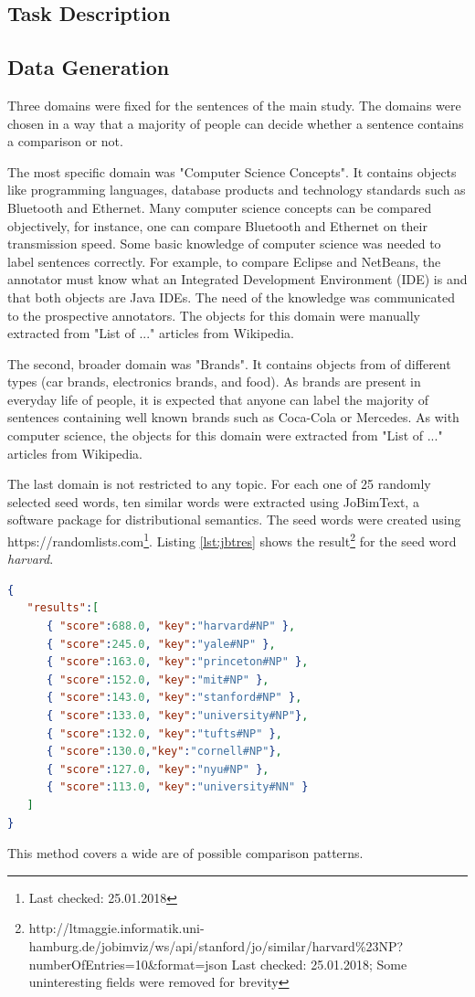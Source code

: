 \subsection{Task Description}
\subsection{Data Generation}
Three domains were fixed for the sentences of the main study. The domains were chosen in a way that a majority of people can decide whether a sentence contains a comparison or not.

The most specific domain was "Computer Science Concepts". It contains objects like programming languages, database products and technology standards such as Bluetooth and Ethernet.  Many computer science concepts can be compared objectively, for instance, one can compare Bluetooth and Ethernet on their transmission speed. Some basic knowledge of computer science was needed to label sentences correctly. For example, to compare Eclipse and NetBeans, the annotator must know what an Integrated Development Environment (IDE) is and that both objects are Java IDEs.  The need of the knowledge was communicated to the prospective annotators. The objects for this domain were manually extracted from "List of ..." articles from Wikipedia.

The second, broader domain was "Brands". It contains objects from of different types (car brands, electronics brands, and food). As brands are present in everyday life of people, it is expected that anyone can label the majority of sentences containing well known brands such as Coca-Cola or Mercedes. As with computer science, the objects for this domain were extracted from "List of ..." articles from Wikipedia.

The last domain is not restricted to any topic. For each one of 25 randomly selected seed words, ten similar words were extracted using JoBimText, a software package for distributional semantics. The seed words were created using https://randomlists.com\footnote{Last checked: 25.01.2018}. Listing \ref{lst:jbtres} shows the result\footnote{http://ltmaggie.informatik.uni-hamburg.de/jobimviz/ws/api/stanford/jo/similar/harvard\%23NP?numberOfEntries=10&format=json Last checked: 25.01.2018; Some uninteresting fields were removed for brevity} for the seed word \emph{harvard}.

\begin{lstlisting}[language=json,label=lst:jbtres,caption=Similar words to "Harvard"]
{
   "results":[
      { "score":688.0, "key":"harvard#NP" },
      { "score":245.0, "key":"yale#NP" },
      { "score":163.0, "key":"princeton#NP" },
      { "score":152.0, "key":"mit#NP" },
      { "score":143.0, "key":"stanford#NP" },
      { "score":133.0, "key":"university#NP"},
      { "score":132.0, "key":"tufts#NP" },
      { "score":130.0,"key":"cornell#NP"},
      { "score":127.0, "key":"nyu#NP" },
      { "score":113.0, "key":"university#NN" }
   ]
}
\end{lstlisting}
This method covers a wide are of possible comparison patterns.\newline

